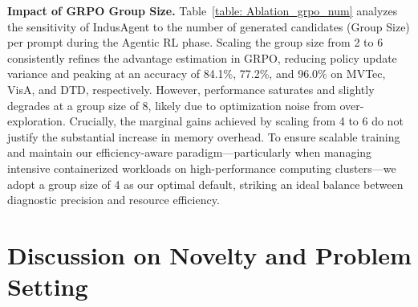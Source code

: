 \documentclass{llmxive}
\begin{document}
{\begin{table}[t]
\vspace{-1.5em} %
\centering
{}
\vspace{-1.0em} %

\caption{Ablation on the number of generated candidates per prompt.}
\label{table: Ablation_grpo_num}
\end{table}



\textbf{Impact of GRPO Group Size.} Table~\ref{table: Ablation_grpo_num} analyzes the sensitivity of IndusAgent to the number of generated candidates (Group Size) per prompt during the Agentic RL phase. Scaling the group size from 2 to 6 consistently refines the advantage estimation in GRPO, reducing policy update variance and peaking at an accuracy of 84.1\%, 77.2\%, and 96.0\% on MVTec, VisA, and DTD, respectively. However, performance saturates and slightly degrades at a group size of 8, likely due to optimization noise from over-exploration. Crucially, the marginal gains achieved by scaling from 4 to 6 do not justify the substantial increase in memory overhead. To ensure scalable training and maintain our efficiency-aware paradigm---particularly when managing intensive containerized workloads on high-performance computing clusters---we adopt a group size of 4 as our optimal default, striking an ideal balance between diagnostic precision and resource efficiency.



\section{Discussion on Novelty and Problem Setting}
\label{appx:discussion_novelty}

}
\end{document}
